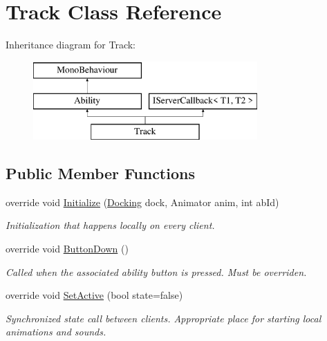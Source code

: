 \hypertarget{class_track}{}\section{Track Class Reference}
\label{class_track}
Inheritance diagram for Track\+:\begin{figure}[H]
\begin{center}
\leavevmode
\includegraphics[height=3.000000cm]{class_track}
\end{center}
\end{figure}
\subsection*{Public Member Functions}
\begin{DoxyCompactItemize}
\item 
override void \hyperlink{class_track_a87f3127370608a55c44203b8551e01e4}{Initialize} (\hyperlink{class_docking}{Docking} dock, Animator anim, int ab\+Id)
\begin{DoxyCompactList}\small\item\em Initialization that happens locally on every client. \end{DoxyCompactList}\item 
override void \hyperlink{class_track_a3f8061a940df45c78ce92a81abde7af5}{Button\+Down} ()
\begin{DoxyCompactList}\small\item\em Called when the associated ability button is pressed. Must be overriden. \end{DoxyCompactList}\item 
override void \hyperlink{class_track_a1eed16343757a39e2e00c23bb4b119da}{Set\+Active} (bool state=false)
\begin{DoxyCompactList}\small\item\em Synchronized state call between clients. Appropriate place for starting local animations and sounds. \end{DoxyCompactList}\end{DoxyCompactItemize}
